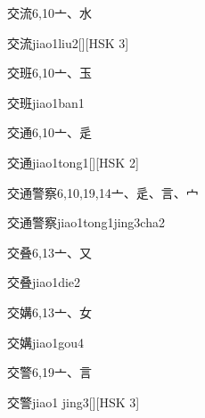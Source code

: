 \begin{entry}{交流}{6,10}{⼇、⽔}
  \begin{phonetics}{交流}{jiao1liu2}[][HSK 3]
  \end{phonetics}
\end{entry}

\begin{entry}{交班}{6,10}{⼇、⽟}
  \begin{phonetics}{交班}{jiao1ban1}
  \end{phonetics}
\end{entry}

\begin{entry}{交通}{6,10}{⼇、⾡}
  \begin{phonetics}{交通}{jiao1tong1}[][HSK 2]
  \end{phonetics}
\end{entry}

\begin{entry}{交通警察}{6,10,19,14}{⼇、⾡、⾔、⼧}
  \begin{phonetics}{交通警察}{jiao1tong1jing3cha2}
  \end{phonetics}
\end{entry}

\begin{entry}{交叠}{6,13}{⼇、⼜}
  \begin{phonetics}{交叠}{jiao1die2}
  \end{phonetics}
\end{entry}

\begin{entry}{交媾}{6,13}{⼇、⼥}
  \begin{phonetics}{交媾}{jiao1gou4}
  \end{phonetics}
\end{entry}

\begin{entry}{交警}{6,19}{⼇、⾔}
  \begin{phonetics}{交警}{jiao1 jing3}[][HSK 3]
  \end{phonetics}
\end{entry}

